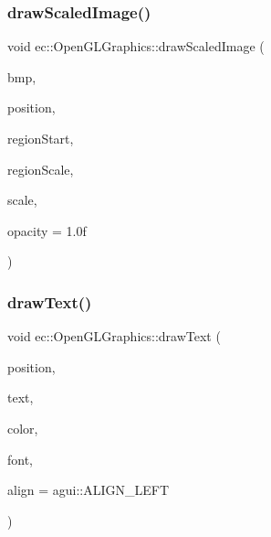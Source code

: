 \mbox{\label{classec_1_1_open_g_l_graphics_aee62c8abe90fd8b17b4730a9c21b9728}} 
\subsubsection{\texorpdfstring{draw\+Scaled\+Image()}{drawScaledImage()}}
{\footnotesize\ttfamily void ec\+::\+Open\+G\+L\+Graphics\+::draw\+Scaled\+Image (\begin{DoxyParamCaption}\item[{const agui\+::\+Image $\ast$}]{bmp,  }\item[{const agui\+::\+Point \&}]{position,  }\item[{const agui\+::\+Point \&}]{region\+Start,  }\item[{const agui\+::\+Dimension \&}]{region\+Scale,  }\item[{const agui\+::\+Dimension \&}]{scale,  }\item[{const float \&}]{opacity = {\ttfamily 1.0f} }\end{DoxyParamCaption})\hspace{0.3cm}{\ttfamily [override]}}

\mbox{\label{classec_1_1_open_g_l_graphics_ae3901503a573bd38db1a13d9ceca4054}} 
\subsubsection{\texorpdfstring{draw\+Text()}{drawText()}}
{\footnotesize\ttfamily void ec\+::\+Open\+G\+L\+Graphics\+::draw\+Text (\begin{DoxyParamCaption}\item[{const agui\+::\+Point \&}]{position,  }\item[{const char $\ast$}]{text,  }\item[{const agui\+::\+Color \&}]{color,  }\item[{const agui\+::\+Font $\ast$}]{font,  }\item[{agui\+::\+Alignment\+Enum}]{align = {\ttfamily agui\+:\+:ALIGN\+\_\+LEFT} }\end{DoxyParamCaption})\hspace{0.3cm}{\ttfamily [override]}}

